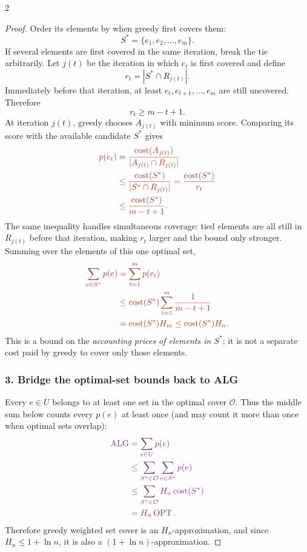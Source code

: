 \documentclass[8pt]{extarticle}
\theoremstyle{definition}
\newcommand{\OPT}{\operatorname{OPT}}
\newcommand{\ALG}{\operatorname{ALG}}
\begin{document}
\begin{multicols*}{2}
\begin{proof}
Order its elements by when greedy first covers them:
\[
  S^*=\{e_1,e_2,\ldots,e_m\}.
\]
If several elements are first covered in the same iteration, break the tie
arbitrarily. Let $j(t)$ be the iteration in which $e_t$ is first covered and
define
\[
  r_t=|S^*\cap R_{j(t)}|.
\]
Immediately before that iteration, at least
$e_t,e_{t+1},\ldots,e_m$ are still uncovered. Therefore
\[
  r_t\geq m-t+1.
\]
At iteration $j(t)$, greedy chooses $A_{j(t)}$ with minimum score. Comparing
its score with the available candidate $S^*$ gives
\[
  \color{optred}
  \begin{aligned}
  p(e_t)
  &=\frac{\operatorname{cost}(A_{j(t)})}
          {|A_{j(t)}\cap R_{j(t)}|}\\
  &\leq\frac{\operatorname{cost}(S^*)}{|S^*\cap R_{j(t)}|}
   =\frac{\operatorname{cost}(S^*)}{r_t}\\
  &\leq\frac{\operatorname{cost}(S^*)}{m-t+1}.
  \end{aligned}
\]
The same inequality handles simultaneous coverage: tied elements are all
still in $R_{j(t)}$ before that iteration, making $r_t$ larger and the bound
only stronger. Summing over the elements of this one optimal set,
\[
  \color{optred}
  \begin{aligned}
  \sum_{e\in S^*}p(e)
  &=\sum_{t=1}^{m}p(e_t)\\
  &\leq\operatorname{cost}(S^*)
    \sum_{t=1}^{m}\frac1{m-t+1}\\
  &=\operatorname{cost}(S^*)H_m
   \leq\operatorname{cost}(S^*)H_n.
  \end{aligned}
\]
This is a bound on the \emph{accounting prices of elements in $S^*$}; it is
not a separate cost paid by greedy to cover only those elements.

\subsubsection*{\textcolor{bridgepurple}{3. Bridge the optimal-set bounds back to ALG}}

Every $e\in U$ belongs to at least one set in the optimal cover $\mathcal O$.
Thus the middle sum below counts every $p(e)$ at least once (and may count it
more than once when optimal sets overlap):
\[
  \color{bridgepurple}
  \begin{aligned}
  \ALG
  &=\sum_{e\in U}p(e)\\
  &\leq\sum_{S^*\in\mathcal O}\sum_{e\in S^*}p(e)\\
  &\leq\sum_{S^*\in\mathcal O}
      H_n\operatorname{cost}(S^*)\\
  &=H_n\OPT.
  \end{aligned}
\]
Therefore greedy weighted set cover is an $H_n$-approximation, and since
$H_n\leq1+\ln n$, it is also a $(1+\ln n)$-approximation.
\end{proof}




\end{multicols*}
\end{document}
